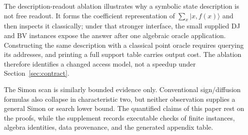 \documentclass[11pt]{article}
\begin{document}
The description-readout ablation illustrates why a symbolic state description is not free readout. It forms the coefficient representation of $\sum_x|x,f(x)\rangle$ and then inspects it classically; under that stronger interface, the small supplied DJ and BV instances expose the answer after one algebraic oracle application. Constructing the same description with a classical point oracle requires querying its addresses, and printing a full support table carries output cost. The ablation therefore identifies a changed access model, not a speedup under Section~\ref{sec:contract}.

The Simon scan is similarly bounded evidence only. Conventional sign/diffusion formulas also collapse in characteristic two, but neither observation supplies a general Simon or search lower bound. The quantified claims of this paper rest on the proofs, while the supplement records executable checks of finite instances, algebra identities, data provenance, and the generated appendix table.
\end{document}
